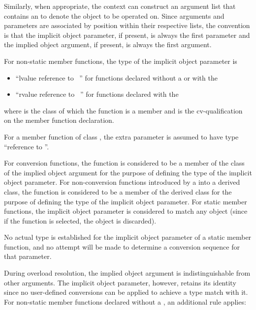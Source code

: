 \pnum
Similarly, when appropriate, the context can construct an
argument list that contains an
to denote
the object to be operated on.
Since arguments and parameters are
associated by position within their respective lists, the
convention is that the implicit object parameter, if present, is
always the first parameter and the implied object argument, if
present, is always the first argument.

\pnum
For non-static member functions, the type of the implicit object
parameter is

\begin{itemize}
\item ``lvalue reference to \cv{}~'' for functions declared
without a  or with the
\tcode{\&} 
\item ``rvalue reference to \cv{}~'' for functions declared with the
\tcode{\&\&} 
\end{itemize}

where
is the class of which the function is a member and
\cv{}
is the cv-qualification on the
member function declaration.
\begin{example}
For a
member
function of class
,
the extra parameter is assumed to have type
``reference to
''.
\end{example}
For conversion functions, the function is considered to be a member of the
class of the implied object argument for the purpose of defining the
type of the implicit object parameter.
For non-conversion functions
introduced by a
into a derived class, the function is
considered to be a member of the derived class for the purpose of defining
the type of the implicit object parameter.
For static member functions, the implicit object parameter is considered
to match any object (since if the function is selected, the object is
discarded).
\begin{note}
No actual type is established for the implicit object parameter
of a static member function, and no attempt will be made to determine a
conversion sequence for that parameter.
\end{note}

\pnum
{}%
During overload resolution, the implied object argument is
indistinguishable from other arguments.
The implicit object
parameter, however, retains its identity since
no user-defined conversions can be applied to achieve a type
match with it.
%
For non-static member functions declared without a ,
an additional rule applies:

